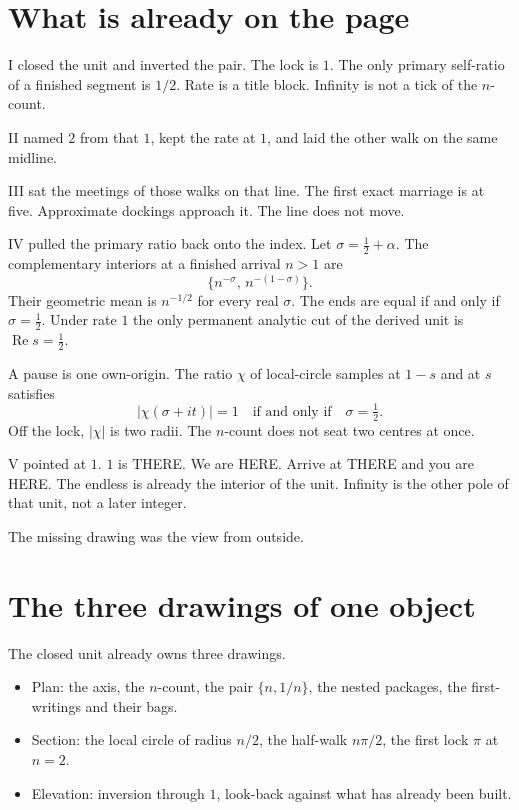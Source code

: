 \documentclass[10pt,a4paper]{article}
\theoremstyle{plain}
\theoremstyle{definition}
\begin{document}
\newpage
\tableofcontents
\newpage

\section{What is already on the page}

I closed the unit and inverted the pair.
The lock is $1$.
The only primary self-ratio of a finished segment is $1/2$.
Rate is a title block.
Infinity is not a tick of the $n$-count.

II named $2$ from that $1$, kept the rate at $1$, and laid the other walk on the same midline.

III sat the meetings of those walks on that line.
The first exact marriage is at five.
Approximate dockings approach it.
The line does not move.

IV pulled the primary ratio back onto the index.
Let $\sigma=\tfrac12+\alpha$.
The complementary interiors at a finished arrival $n>1$ are
\[
\{n^{-\sigma},\,n^{-(1-\sigma)}\}.
\]
Their geometric mean is $n^{-1/2}$ for every real $\sigma$.
The ends are equal if and only if $\sigma=\tfrac12$.
Under rate $1$ the only permanent analytic cut of the derived unit is $\operatorname{Re}s=\tfrac12$.

A pause is one own-origin.
The ratio $\chi$ of local-circle samples at $1-s$ and at $s$ satisfies
\[
\bigl|\chi(\sigma+it)\bigr|=1
\quad\text{if and only if}\quad
\sigma=\tfrac12.
\]
Off the lock, $|\chi|$ is two radii.
The $n$-count does not seat two centres at once.

V pointed at $1$.
$1$ is THERE.
We are HERE.
Arrive at THERE and you are HERE.
The endless is already the interior of the unit.
Infinity is the other pole of that unit, not a later integer.

The missing drawing was the view from outside.

\section{The three drawings of one object}

The closed unit already owns three drawings.

\begin{itemize}
\item Plan: the axis, the $n$-count, the pair $\{n,1/n\}$, the nested packages, the first-writings and their bags.
\item Section: the local circle of radius $n/2$, the half-walk $n\pi/2$, the first lock $\pi$ at $n=2$.
\item Elevation: inversion through $1$, look-back against what has already been built.
\end{itemize}
\end{document}
